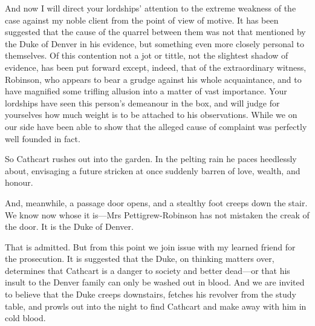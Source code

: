 \begin{dialogue}
\smallskip 

And now I will direct your lordships' attention to the extreme weakness of the case against my noble client from the point of view of motive. It has been suggested that the cause of the quarrel between them was not that mentioned by the Duke of Denver in his evidence, but something even more closely personal to themselves. Of this contention not a jot or tittle, not the slightest shadow of evidence, has been put forward except, indeed, that of the extraordinary witness, Robinson, who appears to bear a grudge against his whole acquaintance, and to have magnified some trifling allusion into a matter of vast importance. Your lordships have seen this person's demeanour in the box, and will judge for yourselves how much weight is to be attached to his observations. While we on our side have been able to show that the alleged cause of complaint was perfectly well founded in fact.

\smallskip 

So Cathcart rushes out into the garden. In the pelting rain he paces heedlessly about, envisaging a future stricken at once suddenly barren of love, wealth, and honour.

\smallskip 

And, meanwhile, a passage door opens, and a stealthy foot creeps down the stair. We know now whose it is\allowbreak---\allowbreak Mrs Pettigrew-Robinson has not mistaken the creak of the door. It is the Duke of Denver.

\smallskip 

That is admitted. But from this point we join issue with my learned friend for the prosecution. It is suggested that the Duke, on thinking matters over, determines that Cathcart is a danger to society and better dead\allowbreak---\allowbreak or that his insult to the Denver family can only be washed out in blood. And we are invited to believe that the Duke creeps downstairs, fetches his revolver from the study table, and prowls out into the night to find Cathcart and make away with him in cold blood.

\smallskip 


\end{dialogue}
